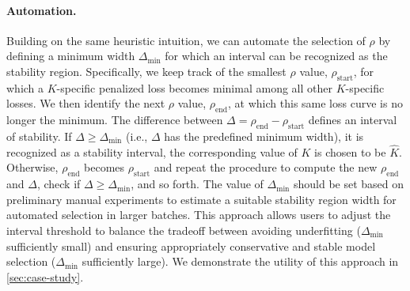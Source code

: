 \paragraph{Automation.}
Building on the same heuristic intuition, we can automate the selection of $\rho$ by defining a minimum width $\Delta_{\min}$ for which an interval can be recognized as the stability region. Specifically,
we keep track of the smallest $\rho$ value, $\rho_\mathrm{start}$, for which a $K$-specific penalized loss becomes minimal among all other $K$-specific losses.
We then identify the next $\rho$ value, $\rho_\mathrm{end}$, at which this same loss curve is no longer the minimum.
The difference between $\Delta = \rho_\mathrm{end} - \rho_\mathrm{start}$ defines an interval of stability.
If $\Delta \ge \Delta_{\min}$ (i.e., $\Delta$ has the predefined minimum width), it is recognized as a stability interval, the corresponding value of $K$ is chosen to be $\widehat K$. Otherwise, $\rho_\mathrm{end}$ becomes $\rho_\mathrm{start}$
and repeat the procedure to compute the new $\rho_\mathrm{end}$ and $\Delta$, check if $\Delta \ge \Delta_{\min}$, and so forth.
The value of $\Delta_{\min}$ should be set based on preliminary manual experiments to estimate a suitable stability region width for automated selection in larger batches. This approach allows users to adjust the interval threshold to balance the tradeoff between avoiding underfitting ($\Delta_{\min}$ sufficiently small) and ensuring appropriately conservative and stable model selection ($\Delta_{\min}$ sufficiently large).
We demonstrate the utility of this approach in \cref{sec:case-study}. %


